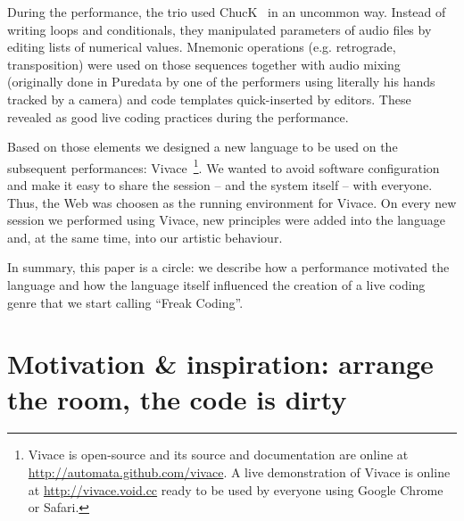 \documentclass[letterpaper, 12pt]{article}
\begin{document}
During the performance, the trio used ChucK~\cite{wang2003chuck} in an
uncommon way. Instead of writing loops and conditionals, they
manipulated parameters of audio files by editing lists of numerical
values. Mnemonic operations (e.g. retrograde, transposition) were used
on those sequences together with audio mixing (originally done in
Puredata by one of the performers using literally his hands tracked by
a camera) and code templates quick-inserted by editors. These revealed
as good live coding practices during the performance.

Based on those elements we designed a new language to be used on the
subsequent performances: Vivace~\footnote{Vivace is open-source and
  its source and documentation are online at
  \url{http://automata.github.com/vivace}. A live demonstration of
  Vivace is online at \url{http://vivace.void.cc} ready to be used by
  everyone using Google Chrome or Safari.}. We wanted to avoid software
configuration and make it easy to share the session -- and the system
itself -- with everyone. Thus, the Web was choosen as the running
environment for Vivace. On every new session we performed using
Vivace, new principles were added into the language and, at the same
time, into our artistic behaviour.

In summary, this paper is a circle: we describe how a performance
motivated the language and how the language itself influenced the
creation of a live coding genre that we start calling ``Freak
Coding''.

%

\parskip 18pt

\section{Motivation \& inspiration: arrange the room, the code is dirty}
\end{document}

